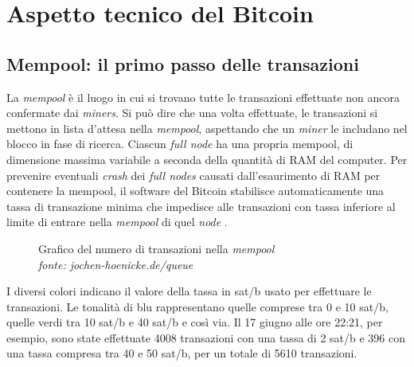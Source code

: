 \documentclass {article}
\begin{document}
\newpage
\null
\newpage


\section {Aspetto tecnico del Bitcoin}


\subsection {Mempool: il primo passo delle transazioni}


La \textit{mempool} è il luogo in cui si trovano tutte le transazioni effettuate non ancora confermate dai \textit{miners}.
Si può dire che una volta effettuate, le transazioni si mettono in lista d'attesa nella \textit{mempool}, aspettando che un \textit{miner} le includano nel blocco in fase di ricerca.
Ciascun \textit{full node} ha una propria mempool, di dimensione massima variabile a seconda della quantità di RAM del computer.
Per prevenire eventuali \textit{crash} dei \textit{full nodes} causati dall'esaurimento di RAM per contenere la mempool, il software del Bitcoin stabilisce automaticamente una tassa di transazione minima che impedisce alle transazioni con tassa inferiore al limite di entrare nella \textit{mempool} di quel \textit{node} \cite{mempool}.

\vspace {0.5cm}
\begin{figure}[htb!]
\captionsetup{width=1.4\linewidth}
\caption {Grafico del numero di transazioni nella \textit{mempool}\\\textit{fonte: jochen-hoenicke.de/queue}}
\end{figure}
\vspace {0.2cm}
\noindent
%
I diversi colori indicano il valore della tassa in sat/b usato per effettuare le transazioni.
Le tonalità di blu rappresentano quelle comprese tra 0 e 10 sat/b, quelle verdi tra 10 sat/b e 40 sat/b e così via.
Il 17 giugno alle ore 22:21, per esempio, sono state effettuate 4008 transazioni con una tassa di 2 sat/b e 396 con una tassa compresa tra 40 e 50 sat/b, per un totale di 5610 transazioni.
\end{document}
